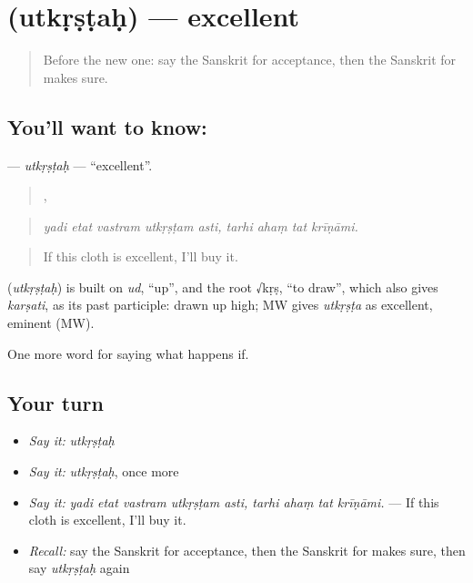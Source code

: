 \section[\texorpdfstring{\sk{उत्कृष्टः} (utkṛṣṭaḥ)}{उत्कृष्टः (utkṛṣṭaḥ)}]{ (utkṛṣṭaḥ) — excellent}

\label{lesson:SA-C542-utkrstah}



\begin{quote}
Before the new one: say the Sanskrit for acceptance, then the Sanskrit for makes sure.
\end{quote}

\subsection*{You'll want to know: }
\textbf{} — \emph{utkṛṣṭaḥ} — \textquotedblleft{}excellent\textquotedblright{}.

\begin{quote}
    ,    
\end{quote}

\begin{quote}
\emph{yadi etat vastram utkṛṣṭam asti, tarhi ahaṃ tat krīṇāmi.}
\end{quote}

\begin{quote}
If this cloth is excellent, I'll buy it.
\end{quote}

\begin{cousinweb}
\textbf{} (\emph{utkṛṣṭaḥ}) is built on \emph{ud}, \textquotedblleft{}up\textquotedblright{}, and the root √kṛṣ, \textquotedblleft{}to draw\textquotedblright{}, which also gives \emph{karṣati}, as its past participle: drawn up high; MW gives \emph{utkṛṣṭa} as excellent, eminent (MW).
\end{cousinweb}

\begin{grammarlens}[title={What you've built}]
One more word for saying what happens if.
\end{grammarlens}

\subsection*{Your turn}
\begin{itemize}
\raggedright
  \item \emph{Say it:} \emph{utkṛṣṭaḥ}
  \item \emph{Say it:} \emph{utkṛṣṭaḥ}, once more
  \item \emph{Say it:} \emph{yadi etat vastram utkṛṣṭam asti, tarhi ahaṃ tat krīṇāmi.} — If this cloth is excellent, I'll buy it.
  \item \emph{Recall:} say the Sanskrit for acceptance, then the Sanskrit for makes sure, then say \emph{utkṛṣṭaḥ} again
\end{itemize}

